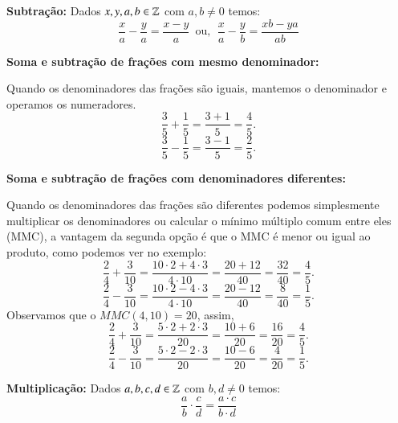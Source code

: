  \colorbox{azul}{
 \begin{minipage}{0.9\linewidth}
 \begin{center}
  \textbf{Subtração:} Dados $x, y, a, b \in \mathbb{Z}$ com $a, b \neq 0$ temos:
 \[\frac{x}{a} - \frac{y}{a}= \frac{x-y}{a} \, \text{ ou}, \ \
 \frac{x}{a} - \frac{y}{b}= \frac{xb - ya}{ab} \]
 \end{center}
 \end{minipage}}

 \vskip0.3cm

 \begin{exem}
  \textbf{Soma e subtração de frações com mesmo denominador:}

   Quando os denominadores das frações são iguais, mantemos o denominador e operamos os numeradores.
    \vskip0.3cm
   \[\frac{3}{5} + \frac{1}{5}= \frac{3+1}{5}= \frac{4}{5} .\]
    \vskip0.3cm
   \[\frac{3}{5} - \frac{1}{5}= \frac{3-1}{5}= \frac{2}{5} .\]
 \end{exem}

 \begin{exem}
 \textbf{Soma e subtração de frações com denominadores diferentes:}

   Quando os denominadores das frações são diferentes podemos simplesmente multiplicar os denominadores ou calcular o mínimo múltiplo comum entre eles (MMC), a vantagem da segunda opção é que o MMC é menor ou igual ao produto, como podemos ver no exemplo:
    \vskip0.3cm
   \[\frac{2}{4} + \frac{3}{10}= \frac{10 \cdot 2 + 4 \cdot 3}{4 \cdot 10}= \frac{20 + 12}{40}= \frac{32}{40}= \frac{4}{5} .\]
    \vskip0.3cm
   \[\frac{2}{4} - \frac{3}{10}= \frac{10 \cdot 2 - 4 \cdot 3}{4 \cdot 10}= \frac{20 - 12}{40}= \frac{8}{40}= \frac{1}{5} .\]
    \vskip0.3cm
   Observamos que o $MMC(4, 10)= 20$, assim,
    \vskip0.3cm
   \[\frac{2}{4} + \frac{3}{10}= \frac{5 \cdot 2 + 2 \cdot 3}{20}= \frac{10+6}{20}= \frac{16}{20}=\frac{4}{5} .\]
    \vskip0.3cm
   \[\frac{2}{4} - \frac{3}{10}= \frac{5 \cdot 2 - 2 \cdot 3}{20}= \frac{10 - 6}{20}= \frac{4}{20}=\frac{1}{5} .\]
 \end{exem}


 \vskip0.5cm

 \colorbox{azul}{
 \begin{minipage}{0.9\linewidth}
 \begin{center}
  \textbf{Multiplicação:} Dados $a, b, c, d \in \mathbb{Z}$ com $b, d \neq 0$ temos:
 \[\frac{a}{b} \cdot \frac{c}{d}= \frac{a \cdot c}{b \cdot d} \]
 \end{center}
 \end{minipage}}

